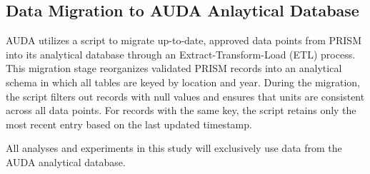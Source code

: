 \subsection{Data Migration to AUDA Anlaytical Database}

AUDA utilizes a script to migrate up-to-date, approved data points from PRISM into its analytical database through an Extract-Transform-Load (ETL) process. This migration stage reorganizes validated PRISM records into an analytical schema in which all tables are keyed by location and year. During the migration, the script filters out records with null values and ensures that units are consistent across all data points. For records with the same key, the script retains only the most recent entry based on the last updated timestamp.

All analyses and experiments in this study will exclusively use data from the AUDA analytical database.
